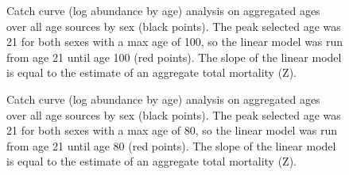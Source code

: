 \documentclass[
]{scrartcl}
\begin{document}
\begin{figure}


\caption{\label{fig-CC_Z_100}Catch curve (log abundance by age) analysis
on aggregated ages over all age sources by sex (black points). The peak
selected age was 21 for both sexes with a max age of 100, so the linear
model was run from age 21 until age 100 (red points). The slope of the
linear model is equal to the estimate of an aggregate total mortality
(Z).}

\end{figure}%

\begin{figure}


\caption{\label{fig-CC_Z_80}Catch curve (log abundance by age) analysis
on aggregated ages over all age sources by sex (black points). The peak
selected age was 21 for both sexes with a max age of 80, so the linear
model was run from age 21 until age 80 (red points). The slope of the
linear model is equal to the estimate of an aggregate total mortality
(Z).}

\end{figure}%
\end{document}
